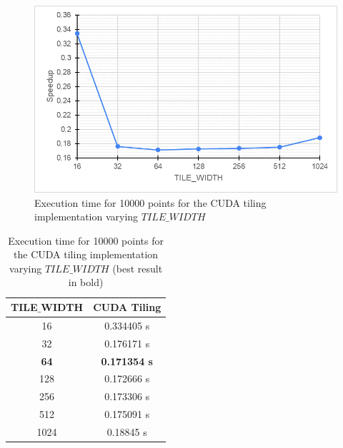 \documentclass[10pt,twocolumn,letterpaper]{article}
\begin{document}
\begin{figure}
\includegraphics[width=0.99\linewidth]{img/chart_tile_width}
\caption{Execution time for 10000 points for the CUDA tiling implementation varying $TILE\_WIDTH$}
\label{fig:chartTileWidth}
\end{figure}

\begin{table}[]
\centering
\begin{tabular}{|c|c|}
\hline
\textbf{\textbf{TILE$\_$WIDTH}} & \textbf{CUDA Tiling} \\ \hline
16 & 0.334405 s \\ \hline
32 & 0.176171 s \\ \hline
\textbf{64} & \textbf{0.171354 s} \\ \hline
128 & 0.172666 s \\ \hline
256 & 0.173306 s \\ \hline
512 & 0.175091 s \\ \hline
1024 & 0.18845 s \\ \hline
\end{tabular}
\caption{Execution time for 10000 points for the CUDA tiling implementation varying $TILE\_WIDTH$ (best result in bold)}
\label{tab:tableCudaSpeedup}
\end{table}
\end{document}
